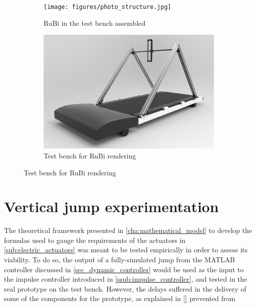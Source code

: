 \begin{figure}[ht!]
    \centering
    \begin{subfigure}[b]{0.49\textwidth}
        \texttt{[image: figures/photo\_structure.jpg]}
        \caption{RuBi in the test bench assembled}
        \label{fig:photo_structure}
    \end{subfigure}
    \begin{subfigure}[b]{0.49\textwidth}
        \includegraphics[width=\textwidth]{figures/legs_structure.jpg}
        \caption{Test bench for RuBi rendering}
        \label{fig:legs_structure}
    \end{subfigure}
\end{figure}  

\section{Vertical jump experimentation} %
\label{sec:vertical_jump_experimentation}
The theoretical framework presented in \ref{cha:mathematical_model} to develop the formulas used to gauge the requirements of the actuators in \ref{sub:electric_actuators} was meant to be tested empirically in order to assess its viability.
To do so, the output of a fully-simulated jump from the MATLAB controller discussed in \ref{sec_dynamic_controller} would be used as the input to the impulse controller introduced in \ref{ssub:impulse_controller}, and tested in the real prototype on the test bench.
However, the delays suffered in the delivery of some of the components for the prototype, as explained in \ref{} %
prevented from 


